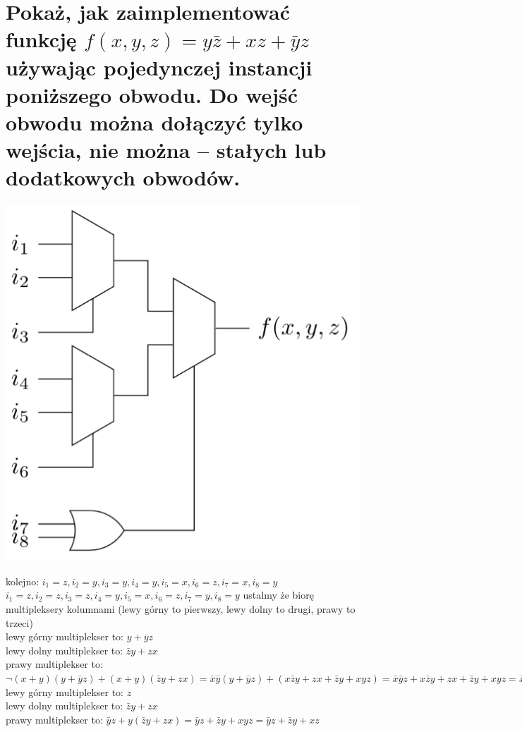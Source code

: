 \documentclass{article}
\begin{document}
\section{Pokaż, jak zaimplementować funkcję $f (x, y, z) = y\bar z + xz + \bar yz$ używając pojedynczej instancji poniższego obwodu. Do wejść obwodu można dołączyć tylko wejścia, nie można – stałych lub dodatkowych obwodów.}
\begin{center}
\includegraphics[scale=0.4]{./L04_Z08.png}
\end{center}
kolejno: $i_1=z, i_2 = y, i_3 = y, i_4 = y, i_5 = x, i_6 = z, i_7 = x, i_8 = y$\\
$i_1=z, i_2 = z, i_3 = z, i_4 = y, i_5 = x, i_6 = z, i_7 = y, i_8 = y$
ustalmy  że biorę multipleksery kolumnami (lewy górny to pierwszy, lewy dolny to drugi, prawy to trzeci)\\
lewy górny multiplekser to: $y+\bar{y}z$\\
lewy dolny multiplekser to: $\bar{z}y + zx$\\
prawy multiplekser to: $\neg(x + y)(y+\bar{y}z) + (x+y)(\bar{z}y + zx)=\bar{x}\bar{y}(y+\bar{y}z) + (x\bar{z}y + zx + \bar{z}y + xyz) = \bar{x}\bar{y}z + x\bar{z}y + zx + \bar{z}y + xyz = \bar{x}\bar{y}z + zx + \bar{z}y + xyz$  \\
lewy górny multiplekser to: $z$\\
lewy dolny multiplekser to: $\bar{z}y + zx$\\
prawy multiplekser to: $\bar{y}z + y(\bar{z}y + zx)= \bar{y}z + \bar{z}y + xyz =  \bar{y}z + \bar{z}y + xz$ \\
\end{document}
